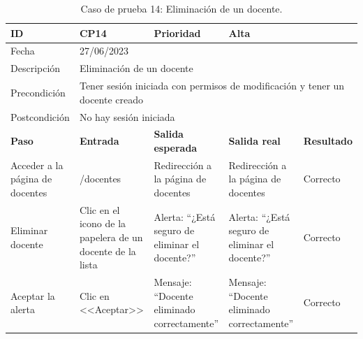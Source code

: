 \begin{table}[H]
\begin{tabular}{p{} p{} p{} p{} p{}}
\cellcolor{gray!25}
ID   & CP14 & \cellcolor{gray!25} Prioridad   & Alta \\ \hline
\cellcolor{gray!25} Fecha	&	\multicolumn{4}{l}{27/06/2023} \\ \hline
\cellcolor{gray!25} Descripción		&	\multicolumn{4}{l}{Eliminación de un docente} \\ \hline                                            
\cellcolor{gray!25}
Precondición  & \multicolumn{4}{p{.66\textwidth}}{Tener sesión iniciada con permisos de modificación y tener un docente creado} \\ \hline
\cellcolor{gray!25} Postcondición & \multicolumn{4}{l}{No hay sesión iniciada}                                                    \\ \hline
\rowcolor{gray!25}
\textbf{Paso}   & \textbf{Entrada} & \textbf{Salida esperada} & \textbf{Salida real} & \textbf{Resultado} \\ \hline
Acceder a la página de docentes 
& /docentes                                                                          
& Redirección a la página de docentes                                   
& Redirección a la página de docentes                                   
& Correcto                            
\\ \hline
Eliminar docente
& Clic en el icono de la papelera de un docente de la lista
& Alerta: ``¿Está seguro de eliminar el docente?''
& Alerta: ``¿Está seguro de eliminar el docente?''
& Correcto
\\ \hline
Aceptar la alerta
& Clic en <<Aceptar>>
& Mensaje: ``Docente eliminado correctamente''                      
& Mensaje: ``Docente eliminado correctamente''   
& Correcto                            
\\ \hline              
\end{tabular}
\caption{Caso de prueba 14: Eliminación de un docente.}
\end{table}

